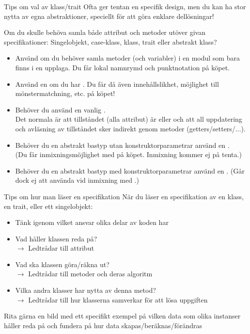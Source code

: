 \begin{Slide}{Tips om val av klass/trait}\SlideFontSmall
Ofta ger tentan en specifik design, men du kan ha stor nytta av egna abstraktioner, speciellt  för att göra enklare dellösningar!

\pause\vspace{1em}Om du skulle behöva samla både attribut och metoder utöver givan specifikationer:
Singelobjekt, case-klass, klass, trait eller abstrakt klass?
\begin{itemize}\SlideFontTiny
\item Använd  om du behöver samla metoder (och variabler) i en modul som bara finns i en upplaga. Du får lokal namnrymd och punktnotation på köpet.
\item Använd en  om du har . Du får då även innehållslikhet, möjlighet till mönstermatchning, etc. på köpet! 
\item Behöver du  använd en vanlig .\\ Det normala är att tillståndet (alla attribut) är  eller  och att all uppdatering och avläsning av tillståndet sker indirekt genom metoder (getters/setters/...). 
\item Behöver du en abstrakt bastyp utan konstruktorparametrar använd en . \\(Du får inmixningsmöjlighet med  på köpet. Inmixning kommer ej på tenta.)
\item Behöver du en abstrakt bastyp med konstruktorparametrar använd en . (Går dock ej att använda vid inmixning med .)
\end{itemize}
\end{Slide}


\begin{Slide}{Tips om hur man läser en specifikation}\SlideFontSmall
När du läser en specifikation av en klass, en trait, eller ett singelobjekt:
\begin{itemize}
\item Tänk igenom vilket ansvar olika delar av koden har
\item Vad håller klassen reda på? \\$\rightarrow$ Ledtrådar till attribut
\item Vad ska klassen göra/räkna ut? \\$\rightarrow$ Ledtrådar till metoder och deras algoritm
\item Vilka andra klasser har nytta av denna metod? \\$\rightarrow$ Ledtrådar till hur klasserna samverkar för att lösa uppgiften
\end{itemize}
Rita gärna en bild med ett specifikt exempel på vilken data som olika instanser håller reda på och fundera på hur data skapas/beräknas/förändras
\end{Slide}


